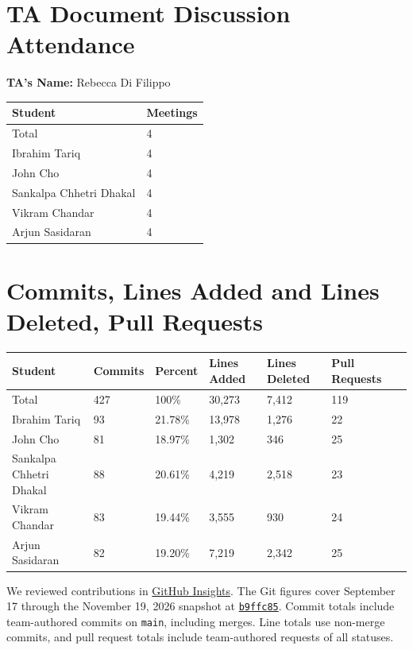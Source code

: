 \documentclass{article}
\begin{document}
\section{TA Document Discussion Attendance}

\noindent \textbf{TA's Name:} Rebecca Di Filippo

\begin{table}[H]
\centering
\begin{tabular}{ll}
\toprule
\textbf{Student} & \textbf{Meetings}\\
\midrule
Total & 4\\
Ibrahim Tariq & 4\\
John Cho & 4\\
Sankalpa Chhetri Dhakal & 4\\
Vikram Chandar & 4\\
Arjun Sasidaran & 4\\
\bottomrule
\end{tabular}
\end{table}

\section{Commits, Lines Added and Lines Deleted, Pull Requests}

\begin{table}[H]
\centering
\begin{tabular}{lllllll}
\toprule
\textbf{Student} & \textbf{Commits} & \textbf{Percent} & \textbf{Lines Added} &
\textbf{Lines Deleted} & \textbf{Pull Requests}\\
\midrule
Total & 427 & 100\% & 30,273 & 7,412 & 119\\
Ibrahim Tariq & 93 & 21.78\% & 13,978 & 1,276 & 22\\
John Cho & 81 & 18.97\% & 1,302 & 346 & 25\\
Sankalpa Chhetri Dhakal & 88 & 20.61\% & 4,219 & 2,518 & 23\\
Vikram Chandar & 83 & 19.44\% & 3,555 & 930 & 24\\
Arjun Sasidaran & 82 & 19.20\% & 7,219 & 2,342 & 25\\
\bottomrule
\end{tabular}
\end{table}

We reviewed contributions in
\href{https://github.com/SoftwareMandems/FPVR/graphs/contributors}{GitHub Insights}.
The Git figures cover September 17 through the November 19, 2026 snapshot at
\href{https://github.com/SoftwareMandems/FPVR/commit/b9ffc85a6e601fa25f906428faeb0058c3502530}{\texttt{b9ffc85}}.
Commit totals include team-authored commits on \texttt{main}, including
merges. Line totals use non-merge commits, and pull request totals include
team-authored requests of all statuses.
\end{document}
